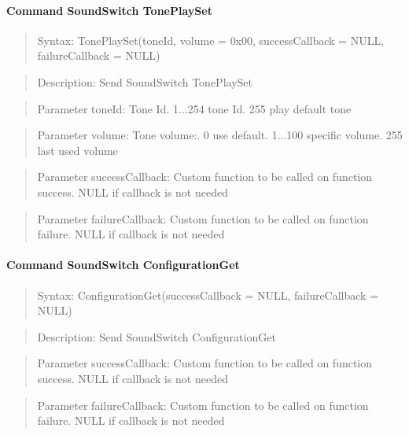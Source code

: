 \paragraph{Command SoundSwitch TonePlaySet}
\begin{quote}Syntax: TonePlaySet(toneId, volume = 0x00, successCallback = NULL, failureCallback = NULL)\end{quote}
\begin{quote}Description: Send SoundSwitch TonePlaySet\end{quote}
\begin{quote}Parameter toneId: Tone Id. 1...254 tone Id. 255 play default tone\end{quote}
\begin{quote}Parameter volume: Tone volume:. 0 use default. 1...100 specific volume. 255 last used volume\end{quote}
\begin{quote}Parameter successCallback: Custom function to be called on function success. NULL if callback is not needed\end{quote}
\begin{quote}Parameter failureCallback: Custom function to be called on function failure. NULL if callback is not needed\end{quote}


\paragraph{Command SoundSwitch ConfigurationGet}
\begin{quote}Syntax: ConfigurationGet(successCallback = NULL, failureCallback = NULL)\end{quote}
\begin{quote}Description: Send SoundSwitch ConfigurationGet\end{quote}
\begin{quote}Parameter successCallback: Custom function to be called on function success. NULL if callback is not needed\end{quote}
\begin{quote}Parameter failureCallback: Custom function to be called on function failure. NULL if callback is not needed\end{quote}


